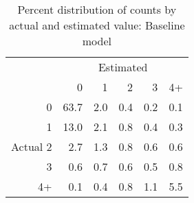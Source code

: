 \begin{table}[ht]
\centering
\caption{Percent distribution of counts by actual and estimated value: Baseline model} 
\label{tab:confusion_matrix_Baseline}
\begin{tabular}{rrrrrr}
  \hline & \multicolumn{5}{c}{Estimated}\\ & 0 & 1 & 2 & 3 & 4+ \\ 
          0 & 63.7 & 2.0 & 0.4 & 0.2 & 0.1 \\ 
           1 & 13.0 & 2.1 & 0.8 & 0.4 & 0.3 \\ 
  Actual   2 & 2.7 & 1.3 & 0.8 & 0.6 & 0.6 \\ 
           3 & 0.6 & 0.7 & 0.6 & 0.5 & 0.8 \\ 
           4+ & 0.1 & 0.4 & 0.8 & 1.1 & 5.5 \\ 
   \hline
\end{tabular}
\end{table}

